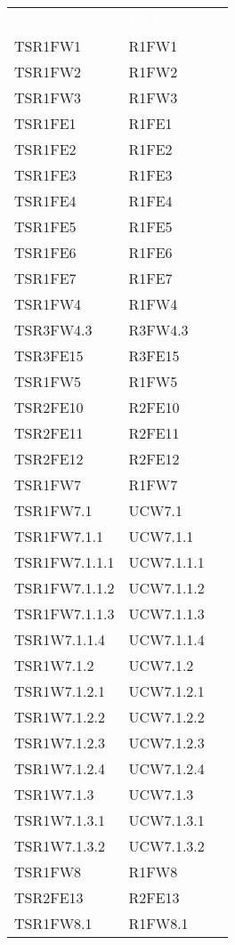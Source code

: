 \renewcommand{\arraystretch}{1.5}
\begin{longtable}{ m{}<{\centering}  m{}<{\centering} }
	\rowcolor{darkblue}
	\textcolor{white}{\textbf{ID Test}} &\textcolor{white}{\textbf{ID Requisito}}\\ 
	 
	TSR1FW1 & R1FW1 \\
	TSR1FW2 &  R1FW2 \\
	TSR1FW3 & R1FW3 \\
	TSR1FE1 & R1FE1 \\
	TSR1FE2 & R1FE2 \\
	TSR1FE3 & R1FE3 \\
	TSR1FE4 & R1FE4 \\
	TSR1FE5 & R1FE5 \\
	TSR1FE6 & R1FE6 \\
	TSR1FE7 & R1FE7 \\
	TSR1FW4 & R1FW4 \\
	TSR3FW4.3 & R3FW4.3\\
	TSR3FE15 & R3FE15 \\
	TSR1FW5 & R1FW5 \\
	TSR2FE10 & R2FE10 \\	 
	TSR2FE11 & R2FE11 \\
	TSR2FE12 & R2FE12 \\
	TSR1FW7 & R1FW7 \\
	TSR1FW7.1 & UCW7.1 \\
	TSR1FW7.1.1 & UCW7.1.1 \\
	TSR1FW7.1.1.1 & UCW7.1.1.1 \\
	TSR1FW7.1.1.2 & UCW7.1.1.2 \\
	TSR1FW7.1.1.3 & UCW7.1.1.3 \\
	TSR1W7.1.1.4 & UCW7.1.1.4 \\
	TSR1W7.1.2 & UCW7.1.2 \\
	TSR1W7.1.2.1 & UCW7.1.2.1 \\
	TSR1W7.1.2.2 & UCW7.1.2.2 \\
	TSR1W7.1.2.3 & UCW7.1.2.3 \\
	TSR1W7.1.2.4 & UCW7.1.2.4 \\
	TSR1W7.1.3 & UCW7.1.3 \\
	TSR1W7.1.3.1 & UCW7.1.3.1 \\
	TSR1W7.1.3.2 & UCW7.1.3.2 \\
	TSR1FW8 & R1FW8 \\
	TSR2FE13 & R2FE13 \\
	TSR1FW8.1 & R1FW8.1 \\

\end{longtable}
